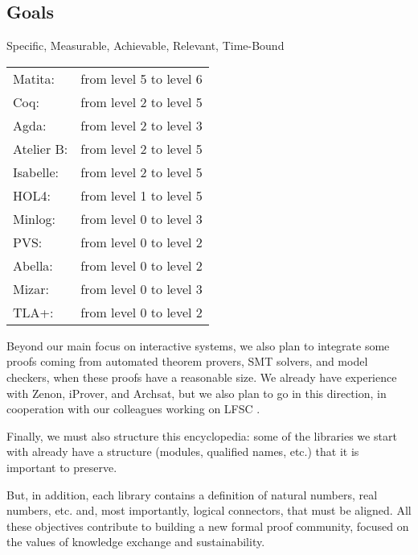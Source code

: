 \subsection{Goals}

Specific, Measurable, Achievable, Relevant, Time-Bound

\begin{tabular}{ll}
Matita:& from level 5 to level 6\\
Coq:& from level 2 to level 5\\
Agda:& from level 2 to level 3\\
Atelier B:& from level 2 to level 5\\
Isabelle:& from level 2 to level 5\\
HOL4:& from level 1 to level 5\\
Minlog:& from level 0 to level 3\\
PVS:& from level 0 to level 2\\
Abella:& from level 0 to level 2\\
Mizar:& from level 0 to level 3\\
TLA+:& from level 0 to level 2
\end{tabular}


Beyond our main focus on interactive systems, we also plan to
integrate some proofs coming from automated theorem provers, SMT
solvers, and model checkers, when these proofs have a reasonable
size. We already have experience with Zenon, iProver, and Archsat, but
we also plan to go in this direction, in cooperation with our
colleagues working on LFSC \cite{Stump09}.

Finally, we must also structure this encyclopedia: some of the
libraries we start with already have a structure (modules, qualified
names, etc.) that it is important to preserve.

But, in addition, each library contains a definition of natural
numbers, real numbers, etc. and, most importantly, logical connectors,
that must be aligned.  All these objectives contribute to building a
new formal proof community, focused on the values of knowledge
exchange and sustainability.


